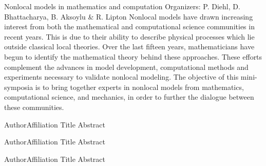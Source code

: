 \label{mini02}

\miniabs
{Nonlocal models in mathematics and computation}
{Organizers: P. Diehl, D. Bhattacharya, B. Aksoylu \& R. Lipton}
{Nonlocal models have drawn increasing interest from both the mathematical and computational science communities in recent years. This is due to their ability to describe physical processes which lie outside classical local theories. Over the last fifteen years, mathematicians have begun to identify the mathematical theory behind these approaches. These efforts complement the advances in model development, computational methods and experiments necessary to validate nonlocal modeling. The objective of this mini-symposia is to bring together experts in nonlocal models from mathematics, computational science, and mechanics, in order to further the dialogue between these communities.}
\vspace{2ex}



\abs
{Author}{Affiliation}
{Title}
{Abstract}

\vspace{1.5ex}

\abs
{Author}{Affiliation}
{Title}
{Abstract}

\vspace{1.5ex}

\abs
{Author}{Affiliation}
{Title}
{Abstract}
